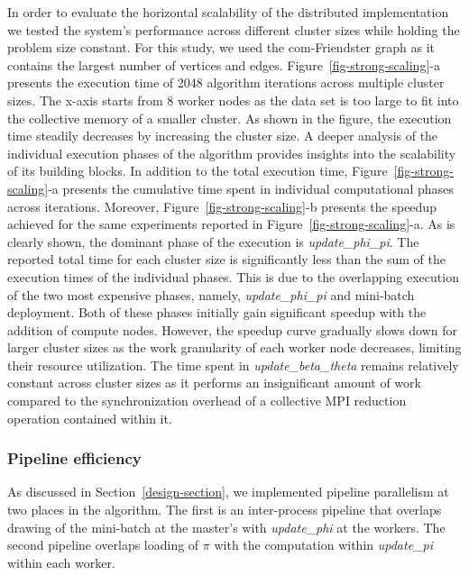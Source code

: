 In order to evaluate the horizontal scalability of the distributed
implementation we tested the system's performance across different cluster
sizes while holding the problem size constant. For this study, we used the
com-Friendster graph as it contains the largest number of vertices and edges.
%
Figure~\ref{fig-strong-scaling}-a presents the execution time of 2048 algorithm
iterations across multiple cluster sizes. The x-axis starts from 8 worker nodes
as the data set is too large to fit into the collective memory of a smaller
cluster.
%
As shown in the figure, the execution
time steadily decreases by increasing the cluster size.
A deeper analysis of the individual execution phases of the algorithm provides
insights into the scalability of its building blocks.
%
In addition to the total execution time, Figure~\ref{fig-strong-scaling}-a
presents the cumulative time spent in individual computational phases across
iterations. Moreover, Figure~\ref{fig-strong-scaling}-b presents the speedup
achieved for the same experiments reported in
Figure~\ref{fig-strong-scaling}-a. As is clearly shown, the dominant phase of
the execution is \textit{update\_phi\_pi}.
The reported total time for each cluster size is significantly less than the
sum of the execution times of the individual phases. This is due to the
overlapping execution of the two most expensive phases, namely,
\textit{update\_phi\_pi} and
mini-batch deployment. Both of these phases initially gain significant speedup with the
addition of compute nodes. However, the speedup curve gradually slows down for
larger cluster sizes as the work granularity of each worker node decreases,
limiting their resource utilization.
%
The time spent in \textit{update\_beta\_theta} remains relatively constant across cluster sizes
as it performs an insignificant amount of work compared to the synchronization
overhead of a collective MPI reduction operation contained within it.

\subsubsection{Pipeline efficiency}
\label{eval-pipeline}

As discussed in Section~\ref{design-section}, we implemented pipeline
parallelism at
two places in the algorithm. The first is an inter-process pipeline that
overlaps drawing of the mini-batch at the master's with \textit{update\_phi}
at the workers. The second pipeline overlaps loading of $\pi$ with the
computation within \textit{update\_pi} within each worker.

